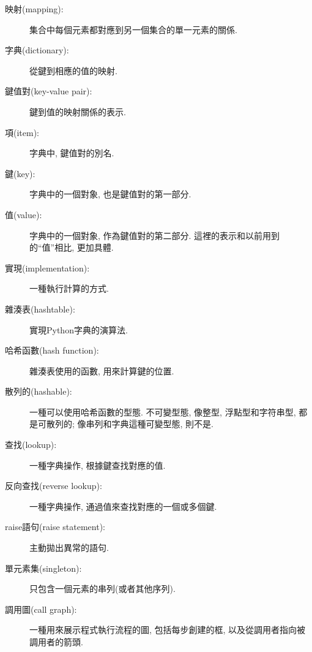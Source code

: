 \documentclass[10pt]{book}
\begin{document}
\begin{description}

\item[映射(mapping):] 集合中每個元素都對應到另一個集合的單一元素的關係.

\item[字典(dictionary):] 從鍵到相應的值的映射. 

\item[鍵值對(key-value pair):] 鍵到值的映射關係的表示. 

\item[項(item):] 字典中, 鍵值對的別名. 

\item[鍵(key):] 字典中的一個對象, 也是鍵值對的第一部分. 

\item[值(value):] 字典中的一個對象, 作為鍵值對的第二部分. 
這裡的表示和以前用到的``值''相比, 更加具體. 

\item[實現(implementation):] 一種執行計算的方式. 

\item[雜湊表(hashtable):] 實現Python字典的演算法. 

\item[哈希函數(hash function):] 雜湊表使用的函數, 用來計算鍵的位置. 

\item[散列的(hashable):] 一種可以使用哈希函數的型態. 
不可變型態, 像整型, 浮點型和字符串型, 都是可散列的;
像串列和字典這種可變型態, 則不是. 

\item[查找(lookup):] 一種字典操作, 根據鍵查找對應的值.

\item[反向查找(reverse lookup):] 一種字典操作, 通過值來查找對應的一個或多個鍵.

\item[raise語句(raise statement):]  主動拋出異常的語句.

\item[單元素集(singleton):] 只包含一個元素的串列(或者其他序列).

\item[調用圖(call graph):] 一種用來展示程式執行流程的圖, 包括每步創建的框, 
以及從調用者指向被調用者的箭頭. 


\end{description}
\end{document}
